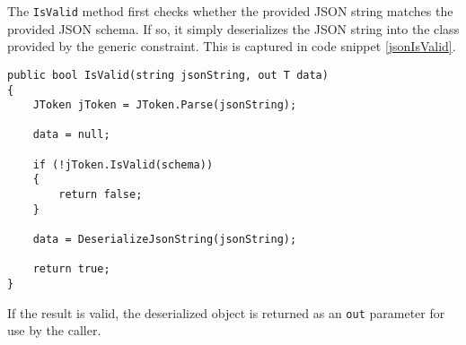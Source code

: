 The \texttt{IsValid} method first checks whether the provided JSON string matches the provided JSON schema.
If so, it simply deserializes the JSON string into the class provided by the generic constraint.
This is captured in code snippet \ref{jsonIsValid}.

\begin{lstlisting}[language=CSharp, caption={The \texttt{IsValid} method from the \texttt{JsonValidator} class.}, label={lst:jsonIsValid}]
public bool IsValid(string jsonString, out T data)
{
	JToken jToken = JToken.Parse(jsonString);

	data = null;

	if (!jToken.IsValid(schema))
	{
		return false;
	}

	data = DeserializeJsonString(jsonString);

	return true;
}
\end{lstlisting}

If the result is valid, the deserialized object is returned as an \texttt{out} parameter for use by the caller.
